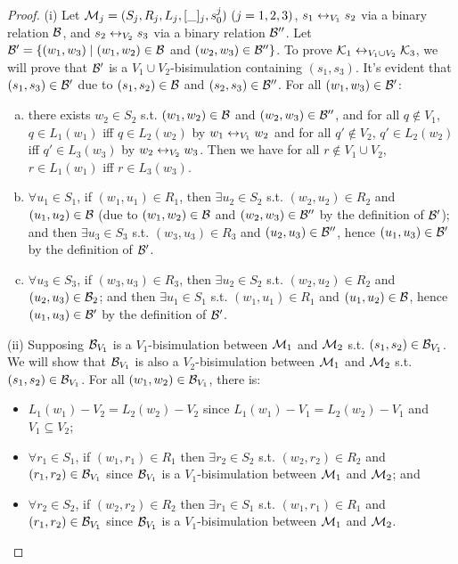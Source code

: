 \documentclass[twoside,11pt]{article}
\begin{document}
	\begin{proof}
		(i) Let ${\cal M}_j=(S_j,R_j,L_j,[\_]_j,s_0^j)~(j=1,2,3)$, $s_1 \leftrightarrow_{V_1} s_2$ via a binary relation ${\cal B}$, and $s_2 \leftrightarrow_{V_2} s_3$ via a binary relation ${\cal B}''$. Let ${\cal B}' = \{(w_1, w_3)\mid (w_1, w_2)\in {\cal B}$ and $(w_2, w_3)\in {\cal B}''\}$. To prove ${\cal K}_1\leftrightarrow_{V_1\cup V_2}{\cal K}_3$, we will prove that ${\cal B}'$ is a  $V_1 \cup V_2$-bisimulation containing $(s_1, s_3)$. It's evident that $(s_1, s_3) \in {\cal B}'$ due to $(s_1,s_2)\in {\cal B}$ and $(s_2, s_3)\in {\cal B}''$.
		For all $(w_1, w_3) \in {\cal B}'$:
		\begin{enumerate}[(a)]
			\item there exists $w_2 \in S_2$ s.t.  $(w_1,w_2)\in {\cal B}$ and $(w_2, w_3)\in {\cal B}''$, and for all $q \notin V_1$, $q \in L_1(w_1)$ iff $q \in L_2(w_2)$ by $w_1 \leftrightarrow_{V_1} w_2$ and for all $q' \notin V_2$, $q'\in L_2(w_2)$ iff $q'\in L_3(w_3)$ by $w_2 \leftrightarrow_{V_2} w_3$. Then we have for all $r\notin V_1 \cup V_2$, $r \in L_1(w_1)$ iff $r \in L_3(w_3)$.
			\item $\forall u_1\in S_1$, if $(w_1, u_1) \in R_1$, then $\exists u_2\in S_2$ s.t.  $(w_2, u_2) \in R_2$ and $(u_1,u_2)\in {\cal B}$ (due to $(w_1,w_2)\in {\cal B}$ and $(w_2, w_3) \in {\cal B}''$ by the definition of ${\cal B}'$); and then $\exists u_3 \in S_3$ s.t.  $(w_3, u_3) \in R_3$ and $(u_2, u_3) \in {\cal B}''$, hence $(u_1, u_3) \in {\cal B}'$ by the definition of ${\cal B}'$.
			\item $\forall u_3\in S_3$, if $(w_3, u_3) \in R_3$, then $\exists u_2\in S_2$ s.t.  $(w_2, u_2) \in R_2$ and $(u_2, u_3) \in {\cal B}_2$; and then $\exists u_1 \in S_1$ s.t.  $(w_1, u_1) \in R_1$ and $(u_1, u_2) \in {\cal B}$, hence $(u_1, u_3) \in {\cal B}'$ by the definition of ${\cal B}'$.
		\end{enumerate}
		
		(ii) Supposing ${\cal B}_{V_1}$ is a $V_1$-bisimulation between ${\cal M}_1$ and ${\cal M}_2$ s.t. $(s_1, s_2)\in {\cal B}_{V_1}$. We will show that ${\cal B}_{V_1}$ is also a $V_2$-bisimulation between ${\cal M}_1$ and ${\cal M}_2$ s.t. $(s_1, s_2)\in {\cal B}_{V_1}$.
		For all $(w_1, w_2) \in {\cal B}_{V_1}$, there is:
		\begin{itemize}
			\item $L_1(w_1) - V_2 = L_2(w_2) -V_2$ since $L_1(w_1) - V_1 = L_2(w_2) -V_1$ and $V_1 \subseteq V_2$;
			\item $\forall r_1 \in S_1$, if $(w_1,r_1) \in R_1$ then $\exists r_2\in S_2$ s.t. $(w_2,r_2)\in R_2$ and $(r_1,r_2) \in {\cal B}_{V_1}$ since ${\cal B}_{V_1}$ is a $V_1$-bisimulation between ${\cal M}_1$ and ${\cal M}_2$; and
			\item $\forall r_2 \in S_2$, if $(w_2,r_2) \in R_2$ then $\exists r_1\in S_1$ s.t. $(w_1,r_1)\in R_1$ and $(r_1,r_2) \in {\cal B}_{V_1}$ since ${\cal B}_{V_1}$ is a $V_1$-bisimulation between ${\cal M}_1$ and ${\cal M}_2$.
		\end{itemize}
		

\end{proof}
\end{document}
